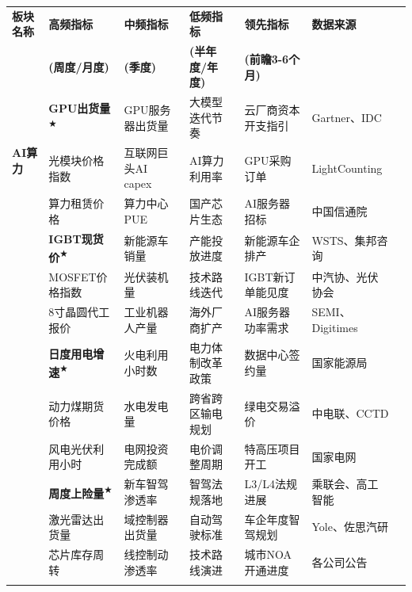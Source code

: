 \begin{table}[htbp]
  \centering
  \scriptsize
  \renewcommand{\arraystretch}{1.5}
  \setlength{\tabcolsep}{4pt}
  \begin{tabular}{@{}ll>{\raggedright\arraybackslash}p{2.6cm}>{\raggedright\arraybackslash}p{2.6cm}>{\raggedright\arraybackslash}p{2.6cm}>{\raggedright\arraybackslash}p{2.6cm}l@{}}
    \toprule
    \textbf{板块名称} & \textbf{高频指标} & \textbf{中频指标} & \textbf{低频指标} & \textbf{领先指标} & \textbf{数据来源} \\
    & \textbf{(周度/月度)} & \textbf{(季度)} & \textbf{(半年度/年度)} & \textbf{(前瞻3-6个月)} & \\
    \midrule

    \multirow{3}{*}{\textbf{AI算力}}
      & \textbf{GPU出货量}\textsuperscript{★} & GPU服务器出货量 & 大模型迭代节奏 & 云厂商资本开支指引 & Gartner、IDC \\
      & 光模块价格指数 & 互联网巨头AI capex & AI算力利用率 & GPU采购订单 & LightCounting \\
      & 算力租赁价格 & 算力中心PUE & 国产芯片生态 & AI服务器招标 & 中国信通院 \\
    \addlinespace

    \multirow{3}{*}{\textbf{功率半导体}}
      & \textbf{IGBT现货价}\textsuperscript{★} & 新能源车销量 & 产能投放进度 & 新能源车企排产 & WSTS、集邦咨询 \\
      & MOSFET价格指数 & 光伏装机量 & 技术路线迭代 & IGBT新订单能见度 & 中汽协、光伏协会 \\
      & 8寸晶圆代工报价 & 工业机器人产量 & 海外厂商扩产 & AI服务器功率需求 & SEMI、Digitimes \\
    \addlinespace

    \multirow{3}{*}{\textbf{电力公用}}
      & \textbf{日度用电增速}\textsuperscript{★} & 火电利用小时数 & 电力体制改革政策 & 数据中心签约量 & 国家能源局 \\
      & 动力煤期货价格 & 水电发电量 & 跨省跨区输电规划 & 绿电交易溢价 & 中电联、CCTD \\
      & 风电光伏利用小时 & 电网投资完成额 & 电价调整周期 & 特高压项目开工 & 国家电网 \\
    \addlinespace

    \multirow{3}{*}{\textbf{智能驾驶}}
      & \textbf{周度上险量}\textsuperscript{★} & 新车智驾渗透率 & 智驾法规落地 & L3/L4法规进展 & 乘联会、高工智能 \\
      & 激光雷达出货量 & 域控制器出货量 & 自动驾驶标准 & 车企年度智驾规划 & Yole、佐思汽研 \\
      & 芯片库存周转 & 线控制动渗透率 & 技术路线演进 & 城市NOA开通进度 & 各公司公告 \\
    \addlinespace


\end{tabular}
\end{table}
